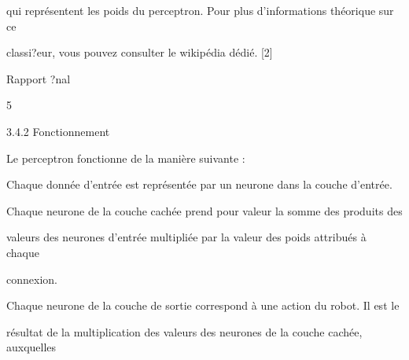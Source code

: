 \documentclass[a4paper,portrait,12pt]{article}
\begin{document}
\begin{flushleft}
qui repr\'{e}sentent les poids du perceptron. Pour plus d'informations th\'{e}orique sur ce
\end{flushleft}


\begin{flushleft}
classi?eur, vous pouvez consulter le wikip\'{e}dia d\'{e}di\'{e}. [2]
\end{flushleft}





\begin{flushleft}
\newpage
Rapport ?nal
\end{flushleft}





5





\begin{flushleft}
3.4.2 Fonctionnement
\end{flushleft}


\begin{flushleft}
Le perceptron fonctionne de la mani\`{e}re suivante :
\end{flushleft}


\begin{flushleft}
Chaque donn\'{e}e d'entr\'{e}e est repr\'{e}sent\'{e}e par un neurone dans la couche d'entr\'{e}e.
\end{flushleft}


\begin{flushleft}
Chaque neurone de la couche cach\'{e}e prend pour valeur la somme des produits des
\end{flushleft}


\begin{flushleft}
valeurs des neurones d'entr\'{e}e multipli\'{e}e par la valeur des poids attribu\'{e}s \`{a} chaque
\end{flushleft}


\begin{flushleft}
connexion.
\end{flushleft}


\begin{flushleft}
Chaque neurone de la couche de sortie correspond \`{a} une action du robot. Il est le
\end{flushleft}


\begin{flushleft}
r\'{e}sultat de la multiplication des valeurs des neurones de la couche cach\'{e}e, auxquelles
\end{flushleft}
\end{document}
